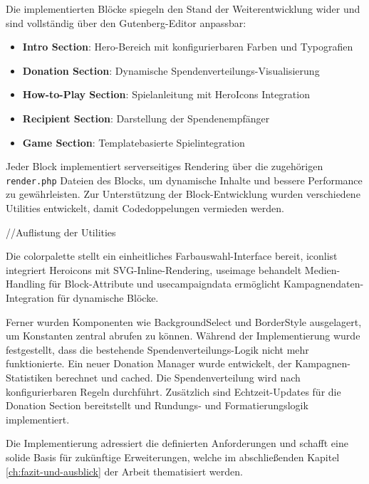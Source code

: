 Die implementierten Blöcke spiegeln den Stand der Weiterentwicklung wider und sind vollständig über den Gutenberg-Editor anpassbar:

\begin{itemize}
    \item \textbf{Intro Section}: Hero-Bereich mit konfigurierbaren Farben und Typografien
    \item \textbf{Donation Section}: Dynamische Spendenverteilungs-Visualisierung
    \item \textbf{How-to-Play Section}: Spielanleitung mit HeroIcons Integration
    \item \textbf{Recipient Section}: Darstellung der Spendenempfänger
    \item \textbf{Game Section}: Templatebasierte Spielintegration
\end{itemize}

Jeder Block implementiert serverseitiges Rendering über die zugehörigen \texttt{render.php} Dateien des Blocks, um dynamische Inhalte und bessere Performance zu gewährleisten.
Zur Unterstützung der Block-Entwicklung wurden verschiedene Utilities entwickelt, damit Codedoppelungen vermieden werden.


//Auflistung der Utilities

Die colorpalette stellt ein einheitliches Farbauswahl-Interface bereit, iconlist integriert Heroicons mit SVG-Inline-Rendering, useimage behandelt Medien-Handling für Block-Attribute und usecampaigndata ermöglicht Kampagnendaten-Integration für dynamische Blöcke.

Ferner wurden Komponenten wie BackgroundSelect und BorderStyle ausgelagert, um Konstanten zentral abrufen zu können.
Während der Implementierung wurde festgestellt, dass die bestehende Spendenverteilungs-Logik nicht mehr funktionierte.
Ein neuer Donation Manager wurde entwickelt, der Kampagnen-Statistiken berechnet und cached.
Die Spendenverteilung wird nach konfigurierbaren Regeln durchführt.
Zusätzlich sind Echtzeit-Updates für die Donation Section bereitstellt und Rundungs- und Formatierungslogik implementiert.

Die Implementierung adressiert die definierten Anforderungen und schafft eine solide Basis für zukünftige Erweiterungen, welche im abschließenden Kapitel \ref{ch:fazit-und-ausblick} der Arbeit thematisiert werden.
